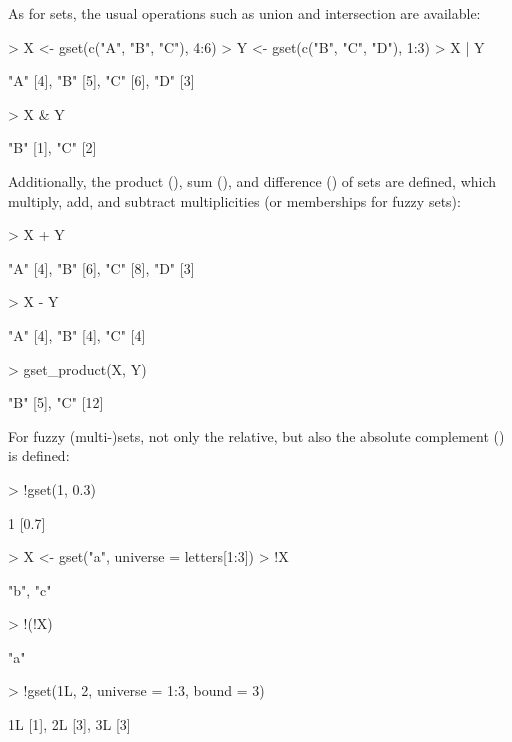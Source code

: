 \documentclass[article]{jss}
\newcommand{\codefun}[1]{\code{#1()}}
\begin{document}
As for sets, the usual operations
such as union and intersection are available:
\begin{Schunk}
\begin{Sinput}
> X <- gset(c("A", "B", "C"), 4:6)
> Y <- gset(c("B", "C", "D"), 1:3)
> X | Y
\end{Sinput}
\begin{Soutput}
{"A" [4], "B" [5], "C" [6], "D" [3]}
\end{Soutput}
\begin{Sinput}
> X & Y
\end{Sinput}
\begin{Soutput}
{"B" [1], "C" [2]}
\end{Soutput}
\end{Schunk}
Additionally, the product (\codefun{gset\_product}), sum (\code{+}),
and difference (\code{-}) of sets are defined,
which multiply, add, and subtract
multiplicities (or memberships for fuzzy sets):
\begin{Schunk}
\begin{Sinput}
> X + Y
\end{Sinput}
\begin{Soutput}
{"A" [4], "B" [6], "C" [8], "D" [3]}
\end{Soutput}
\begin{Sinput}
> X - Y
\end{Sinput}
\begin{Soutput}
{"A" [4], "B" [4], "C" [4]}
\end{Soutput}
\begin{Sinput}
> gset_product(X, Y)
\end{Sinput}
\begin{Soutput}
{"B" [5], "C" [12]}
\end{Soutput}
\end{Schunk}
For fuzzy (multi-)sets, not only the relative, but also the
absolute complement (\code{!}) is defined:
\begin{Schunk}
\begin{Sinput}
> !gset(1, 0.3)
\end{Sinput}
\begin{Soutput}
{1 [0.7]}
\end{Soutput}
\begin{Sinput}
> X <- gset("a", universe = letters[1:3])
> !X
\end{Sinput}
\begin{Soutput}
{"b", "c"}
\end{Soutput}
\begin{Sinput}
> !(!X)
\end{Sinput}
\begin{Soutput}
{"a"}
\end{Soutput}
\begin{Sinput}
> !gset(1L, 2, universe = 1:3, bound = 3)
\end{Sinput}
\begin{Soutput}
{1L [1], 2L [3], 3L [3]}
\end{Soutput}
\end{Schunk}
\end{document}
